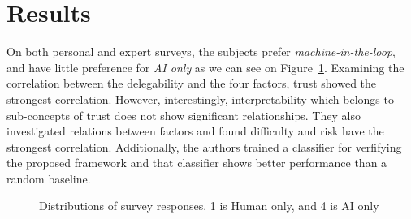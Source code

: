 \documentclass[10pt,twocolumn,letterpaper]{article}
\begin{document}
\section{Results}
On both personal and expert surveys, the subjects prefer \textit{machine-in-the-loop}, and have little preference for \textit{AI only} as we can see on Figure~\ref{fig:dist}. Examining the correlation between the delegability and the four factors, trust showed the strongest correlation. However, interestingly, interpretability which belongs to sub-concepts of trust does not show significant relationships. They also investigated relations between factors and found difficulty and risk have the strongest correlation. Additionally, the authors trained a classifier for verfifying the proposed framework and that classifier shows better performance than a random baseline.


\begin{figure}[b]
	\centering
	\caption{Distributions of survey responses. 1 is Human only, and 4 is AI only}
	\label{fig:dist}
\end{figure}


{\small

%
}


\begin{table}[t]
	\centering
	\caption{
		An overview of the four factors in the framework.
	}\label{tab:four_factors}
\end{table}
\end{document}
